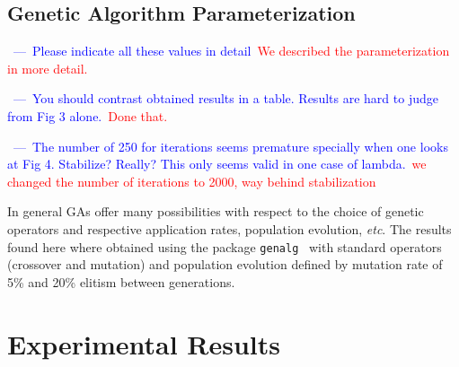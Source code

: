 \documentclass[review,preprint]{elsarticle}
\newcommand{\review}[1]{\textcolor{blue}{~---~#1}}
\newcommand{\revised}[2]{\review{#1}~\textcolor{red}{#2}}
\begin{document}
\subsection{Genetic Algorithm Parameterization}

\revised{Please indicate all these values in detail}{We described the parameterization in more detail.}

\revised{You should contrast obtained results in a table.  Results are hard to judge from Fig 3 alone.}{Done that.}

\revised{The number of 250 for iterations seems premature specially when one looks at Fig 4. Stabilize? Really?  This only seems valid in one case of lambda.}{we changed the number of iterations to 2000, way behind stabilization}

In general \acp{GA} offer many possibilities with respect to the choice of genetic operators and respective application rates, population evolution, \emph{etc}. The results found here where obtained using the package \texttt{genalg}~\citep{Willighagen:2012aa} with standard operators (crossover and mutation) and population evolution defined by mutation rate of 5\% and 20\% elitism between generations.

\section{Experimental Results}\label{sec:experimental.results}
\end{document}
